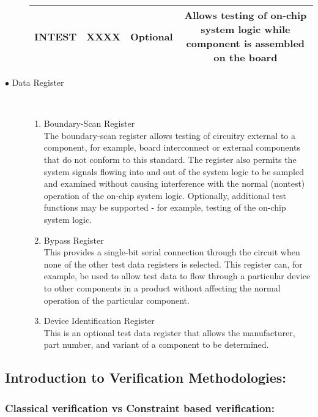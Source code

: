 \documentclass[a4paper,11pt]{article}
\begin{document}
\begin{description}
\begin{center}
\begin{table}[!h]
\begin{tabular}{|c|c|c|c|}
 INTEST & XXXX & Optional & \multicolumn{1}{m{7cm}|}{Allows testing of on-chip system logic while component is assembled on the board}\\\hline 

\end{tabular}
\end{table}
\end{center}

\FloatBarrier
\item [$\bullet$ Data Register]
\  \\

\begin{enumerate}[I]%
\item Boundary-Scan Register
\ \\
The boundary-scan register allows testing of circuitry external to a component, for example, board interconnect or external components that do not conform to this standard. The register also permits the system signals flowing into and out of the system logic to be sampled and examined without causing interference with the normal (nontest) operation of the on-chip system logic. Optionally, additional test functions may be supported - for example, testing of the on-chip system logic.\cite{microsemi}

\item Bypass Register
\ \\
This provides a single-bit serial connection through the circuit when none of the other test data registers is selected. This register can, for example, be used to allow test data to flow through a particular device to other components in a product without affecting the normal operation of the particular component.\cite{microsemi}

\item Device Identification Register
\ \\
This is an optional test data register that allows the manufacturer, part number, and variant of a component to be determined.\cite{microsemi}

\end{enumerate} 

\end{description}


\subsection{Introduction to Verification Methodologies:}


\subsubsection{Classical verification vs Constraint based verification:\cite{doulos}}
\end{document}
